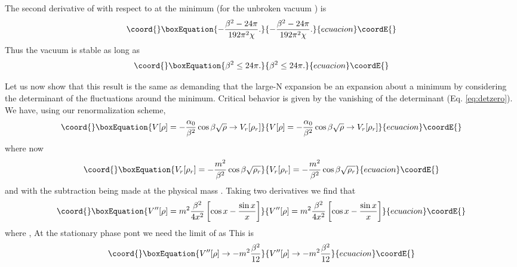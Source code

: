 \documentclass[a4paper,prd,preprint,superscriptaddress,showpacs,byrevtex]{revtex4}
\begin{document}
The second derivative of \coordHE{} with respect to \myHighlight{$\chi$}\coordHE{} at the minimum \coordHE{} (for the unbroken vacuum
\coordHE{})
is
\begin{equation}\coord{}\boxEquation{
- \frac{\beta^2- 24 \pi}{192 \pi^2 \chi}.
}{
- \frac{\beta^2- 24 \pi}{192 \pi^2 \chi}.
}{ecuacion}\coordE{}\end{equation}
Thus the vacuum is stable as long as
\begin{equation}\coord{}\boxEquation{
\beta^2 \leq 24 \pi.
}{
\beta^2 \leq 24 \pi.
}{ecuacion}\coordE{}\end{equation}

Let us now show that this result is the same as demanding that the large-N expansion
be an expansion about a minimum by considering the determinant of the
fluctuations around the minimum. Critical behavior is
given by the vanishing of the determinant (Eq. \ref {eq:detzero}). We have, 
using our renormalization scheme,  \begin{equation}\coord{}\boxEquation{
V[\rho] = -\frac {\alpha_0} {\beta^2} \cos \beta \sqrt{\rho} \rightarrow V_r[\rho_r]
}{
V[\rho] = -\frac {\alpha_0} {\beta^2} \cos \beta \sqrt{\rho} \rightarrow V_r[\rho_r]
}{ecuacion}\coordE{}\end{equation}
where now
\begin{equation}\coord{}\boxEquation{
V_r[\rho_r] =-\frac {m^2} {\beta^2} \cos \beta \sqrt{\rho_r}
}{
V_r[\rho_r] =-\frac {m^2} {\beta^2} \cos \beta \sqrt{\rho_r}
}{ecuacion}\coordE{}\end{equation}
and
\coordHE{} with the subtraction being made at the physical mass \coordHE{}.
Taking two derivatives we find that
\begin{equation}\coord{}\boxEquation{
V''[\rho] = m^2 \frac{\beta^2}{4 x^2} \left[ \cos x - \frac{\sin x}{x}     \right]
}{
V''[\rho] = m^2 \frac{\beta^2}{4 x^2} \left[ \cos x - \frac{\sin x}{x}     \right]
}{ecuacion}\coordE{}\end{equation}
where \coordHE{} , \coordHE{}
At the stationary phase pont we need the limit of \coordHE{} as \coordHE{} 
This is
\begin{equation}\coord{}\boxEquation{
V''[\rho] \rightarrow  -m^2 \frac{\beta^2}{12}
}{
V''[\rho] \rightarrow  -m^2 \frac{\beta^2}{12}
}{ecuacion}\coordE{}\end{equation}
\end{document}
